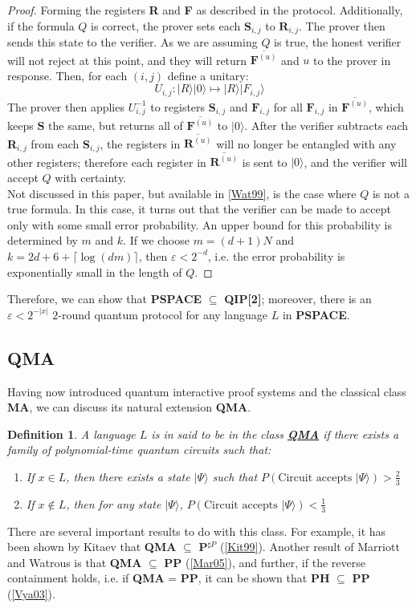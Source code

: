 \documentclass[12pt]{article}
\newtheorem{defn}{Definition}
\numberwithin{thm}{section}
\numberwithin{defn}{section}
\numberwithin{prop}{section}
\numberwithin{rmk}{section}
\newcommand{\ket}[1]{\vert #1 \rangle}
\begin{document}
\begin{proof}
		Forming the registers \textbf{R} and \textbf{F} as described in the protocol. Additionally, if the formula $Q$ is correct, the prover sets each $\textbf{S}_{i,j}$ to $\textbf{R}_{i,j}$. The prover then sends this state to the verifier. As we are assuming $Q$ is true, the honest verifier will not reject at this point, and they will return $\overline{\textbf{F}^{(u)}}$ and $u$ to the prover in response. Then, for each $(i,j)$ define a unitary:
		\[U_{i,j}:\ket{R}\ket{0}\mapsto\ket{R}\ket{F_{i,j}}\]
		The prover then applies $U_{i,j}^{-1}$ to registers $\textbf{S}_{i,j}$ and $\textbf{F}_{i,j}$ for all $\textbf{F}_{i,j}$ in $\overline{\textbf{F}^{(u)}}$, which keeps $\textbf{S}$ the same, but returns all of $\overline{\textbf{F}^{(u)}}$ to $\ket{0}$. After the verifier subtracts each \textbf{R}$_{i,j}$ from each \textbf{S}$_{i,j}$, the registers in $\overline{\textbf{R}^{(u)}}$ will no longer be entangled with any other registers; therefore each register in $\overline{\textbf{R}^{(u)}}$ is sent to $\ket{0}$, and the verifier will accept $Q$ with certainty.\\
		
		Not discussed in this paper, but available in \hyperref[wat99]{[Wat99]}, is the case where $Q$ is not a true formula. In this case, it turns out that the verifier can be made to accept only with some small error probability. An upper bound for this probability is determined by $m$ and $k$. If we choose $m=(d+1)N$ and $k=2d+6+\lceil\log(dm)\rceil$, then $\varepsilon<2^{-d}$, i.e. the error probability is exponentially small in the length of $Q$.
	\end{proof}
	
	\noindent Therefore, we can show that \textbf{PSPACE} $\subseteq$ \textbf{QIP[2]}; moreover, there is an $\varepsilon<2^{-|x|}$ $2$-round quantum protocol for any language $L$ in \textbf{PSPACE}.  
	\subsection{QMA}
	Having now introduced quantum interactive proof systems and the classical class \textbf{MA}, we can discuss its natural extension \textbf{QMA}.
	\begin{defn}
		A language $L$ is in said to be in the class \underline{\textbf{QMA}} if there exists a family of polynomial-time quantum circuits such that:
		\begin{enumerate}
			\item If $x\in L$, then there exists a state $\ket{\Psi}$ such that $P(\text{Circuit accepts } \ket{\Psi})>\frac{2}{3}$
			\item If $x\notin L$, then for any state $\ket{\Psi}$, $P(\text{Circuit accepts } \ket{\Psi})<\frac{1}{3}$
		\end{enumerate}
	\end{defn}
	 There are several important results to do with this class. For example, it has been shown by Kitaev that \textbf{QMA} $\subseteq$ \textbf{P$^{\sharp P}$} (\hyperref[kit99]{[Kit99]}). Another result of Marriott and Watrous is that \textbf{QMA} $\subseteq$ \textbf{PP} (\hyperref[mar05]{[Mar05]}), and further, if the reverse containment holds, i.e. if \textbf{QMA} = \textbf{PP}, it can be shown that \textbf{PH} $\subseteq$ \textbf{PP} (\hyperref[vya03]{[Vya03]}).
\end{document}
